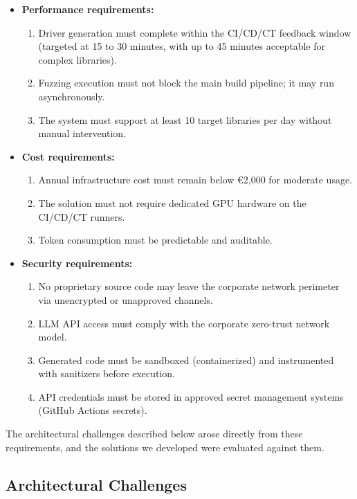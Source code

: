 \begin{itemize}
    \item \textbf{Performance requirements:}
    \begin{enumerate}
        \item Driver generation must complete within the CI/CD/CT feedback window (targeted at 15 to 30 minutes, with up to 45 minutes acceptable for complex libraries).
        \item Fuzzing execution must not block the main build pipeline; it may run asynchronously.
        \item The system must support at least 10 target libraries per day without manual intervention.
    \end{enumerate}
    \item \textbf{Cost requirements:}
    \begin{enumerate}
        \item Annual infrastructure cost must remain below \euro{}2,000 for moderate usage.
        \item The solution must not require dedicated GPU hardware on the CI/CD/CT runners.
        \item Token consumption must be predictable and auditable.
    \end{enumerate}
    \item \textbf{Security requirements:}
    \begin{enumerate}
        \item No proprietary source code may leave the corporate network perimeter via unencrypted or unapproved channels.
        \item LLM API access must comply with the corporate zero-trust network model.
        \item Generated code must be sandboxed (containerized) and instrumented with sanitizers before execution.
        \item API credentials must be stored in approved secret management systems (GitHub Actions secrets).
    \end{enumerate}
\end{itemize}

The architectural challenges described below arose directly from these requirements, and the solutions we developed were evaluated against them.

\subsection{Architectural Challenges}

